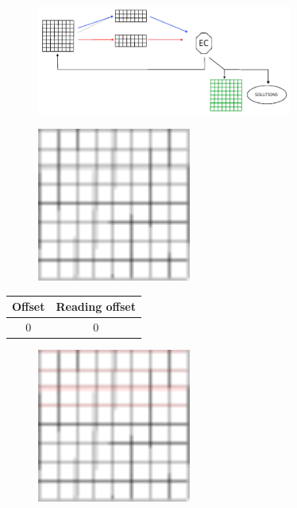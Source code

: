 \documentclass{beamer}
\begin{document}
\begin{frame}{}
    \begin{figure}
        \centering
        \includegraphics[width=0.75\textwidth]{partial_loading_mech.pdf}
        \label{fig:partial_loading_mech}
    \end{figure}
\end{frame}

\begin{frame}{}
    \begin{figure}
        \centering
        \includegraphics[width=0.45\textwidth]{grid_black.pdf}
        \label{fig:grid_black}
    \end{figure}
\end{frame}

\begin{frame}{}
    \begin{table}
        \centering
        \begin{tabular}{|c|c|}
            \hline
            Offset & Reading offset \\
            \hline
            0 & 0 \\
            \hline
        \end{tabular}
    \end{table}
    \begin{figure}
        \centering
        \includegraphics[width=0.45\textwidth]{grid_3r_1.pdf}
        \label{fig:grid_3r_1}
    \end{figure}
\end{frame}
\end{document}
